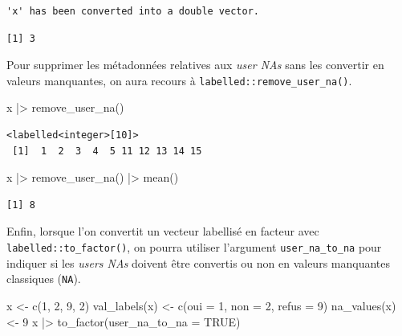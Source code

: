 \documentclass[
  letterpaper,
  DIV=11,
  numbers=noendperiod,
  oneside]{scrreprt}
\newenvironment{Shaded}{\begin{snugshade}}{\end{snugshade}}
\newcommand{\AttributeTok}[1]{\textcolor[rgb]{0.40,0.45,0.13}{#1}}
\newcommand{\ConstantTok}[1]{\textcolor[rgb]{0.56,0.35,0.01}{#1}}
\newcommand{\DecValTok}[1]{\textcolor[rgb]{0.68,0.00,0.00}{#1}}
\newcommand{\FunctionTok}[1]{\textcolor[rgb]{0.28,0.35,0.67}{#1}}
\newcommand{\NormalTok}[1]{\textcolor[rgb]{0.00,0.23,0.31}{#1}}
\newcommand{\OtherTok}[1]{\textcolor[rgb]{0.00,0.23,0.31}{#1}}
\newcommand{\SpecialCharTok}[1]{\textcolor[rgb]{0.37,0.37,0.37}{#1}}
\begin{document}
\begin{verbatim}
'x' has been converted into a double vector.
\end{verbatim}

\begin{verbatim}
[1] 3
\end{verbatim}

Pour supprimer les métadonnées relatives aux \emph{user NAs} sans les
convertir en valeurs manquantes, on aura recours à
\texttt{labelled::remove\_user\_na()}.

\begin{Shaded}
\begin{Highlighting}[]
\NormalTok{x }\SpecialCharTok{|\textgreater{}}
  \FunctionTok{remove\_user\_na}\NormalTok{()}
\end{Highlighting}
\end{Shaded}

\begin{verbatim}
<labelled<integer>[10]>
 [1]  1  2  3  4  5 11 12 13 14 15
\end{verbatim}

\begin{Shaded}
\begin{Highlighting}[]
\NormalTok{x }\SpecialCharTok{|\textgreater{}} 
  \FunctionTok{remove\_user\_na}\NormalTok{() }\SpecialCharTok{|\textgreater{}} 
  \FunctionTok{mean}\NormalTok{()}
\end{Highlighting}
\end{Shaded}

\begin{verbatim}
[1] 8
\end{verbatim}

Enfin, lorsque l'on convertit un vecteur labellisé en facteur avec
\texttt{labelled::to\_factor()}, on pourra utiliser l'argument
\texttt{user\_na\_to\_na} pour indiquer si les \emph{users NAs} doivent
être convertis ou non en valeurs manquantes classiques (\texttt{NA}).

\begin{Shaded}
\begin{Highlighting}[]
\NormalTok{x }\OtherTok{\textless{}{-}} \FunctionTok{c}\NormalTok{(}\DecValTok{1}\NormalTok{, }\DecValTok{2}\NormalTok{, }\DecValTok{9}\NormalTok{, }\DecValTok{2}\NormalTok{)}
\FunctionTok{val\_labels}\NormalTok{(x) }\OtherTok{\textless{}{-}} \FunctionTok{c}\NormalTok{(}\AttributeTok{oui =} \DecValTok{1}\NormalTok{, }\AttributeTok{non =} \DecValTok{2}\NormalTok{, }\AttributeTok{refus =} \DecValTok{9}\NormalTok{)}
\FunctionTok{na\_values}\NormalTok{(x) }\OtherTok{\textless{}{-}} \DecValTok{9}
\NormalTok{x }\SpecialCharTok{|\textgreater{}}
  \FunctionTok{to\_factor}\NormalTok{(}\AttributeTok{user\_na\_to\_na =} \ConstantTok{TRUE}\NormalTok{)}
\end{Highlighting}
\end{Shaded}
\end{document}
